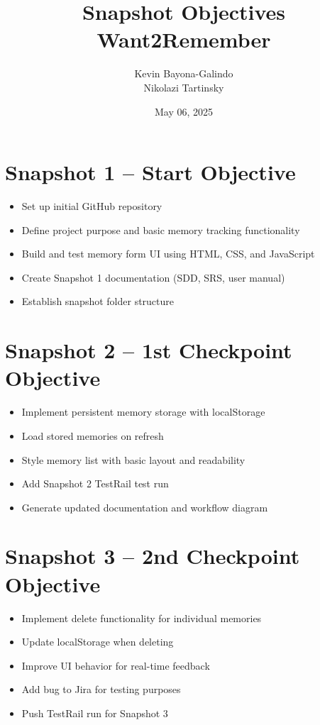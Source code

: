 \documentclass[12pt]{article}
\title{\Huge Snapshot Objectives\\[0.5em]\LARGE Want2Remember}
\author{Kevin Bayona-Galindo \\ Nikolazi Tartinsky}
\date{May 06, 2025}
\begin{document}
\maketitle
\tableofcontents
\newpage

\section{Snapshot 1 – Start Objective}
\begin{itemize}
  \item Set up initial GitHub repository
  \item Define project purpose and basic memory tracking functionality
  \item Build and test memory form UI using HTML, CSS, and JavaScript
  \item Create Snapshot 1 documentation (SDD, SRS, user manual)
  \item Establish snapshot folder structure
\end{itemize}

\section{Snapshot 2 – 1st Checkpoint Objective}
\begin{itemize}
  \item Implement persistent memory storage with localStorage
  \item Load stored memories on refresh
  \item Style memory list with basic layout and readability
  \item Add Snapshot 2 TestRail test run
  \item Generate updated documentation and workflow diagram
\end{itemize}

\section{Snapshot 3 – 2nd Checkpoint Objective}
\begin{itemize}
  \item Implement delete functionality for individual memories
  \item Update localStorage when deleting
  \item Improve UI behavior for real-time feedback
  \item Add bug to Jira for testing purposes
  \item Push TestRail run for Snapshot 3
\end{itemize}
\end{document}
